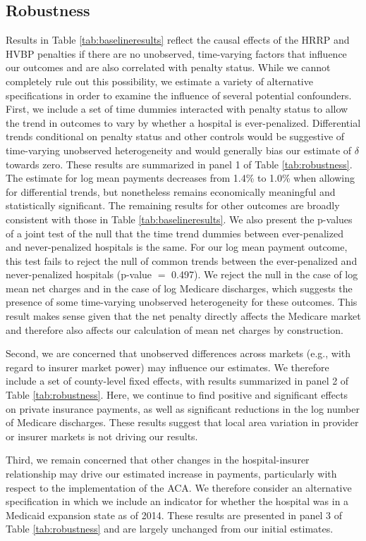 \documentclass[12pt]{article}
\begin{document}
\subsection{Robustness}
Results in Table \ref{tab:baselineresults} reflect the causal effects of the HRRP and HVBP penalties if there are no unobserved, time-varying factors that influence our outcomes and are also correlated with penalty status.  While we cannot completely rule out this possibility, we estimate a variety of alternative specifications in order to examine the influence of several potential confounders.  First, we include a set of time dummies interacted with penalty status to allow the trend in outcomes to vary by whether a hospital is ever-penalized. Differential trends conditional on penalty status and other controls would be suggestive of time-varying unobserved heterogeneity and would generally bias our estimate of $\delta$ towards zero.  These results are summarized in panel 1 of Table \ref{tab:robustness}. The estimate for log mean payments decreases from 1.4\% to 1.0\% when allowing for differential trends, but nonetheless remains economically meaningful and statistically significant. The remaining results for other outcomes are broadly consistent with those in Table \ref{tab:baselineresults}. We also present the p-values of a joint test of the null that the time trend dummies between ever-penalized and never-penalized hospitals is the same. For our log mean payment outcome, this test fails to reject the null of common trends between the ever-penalized and never-penalized hospitals (p-value $=$ 0.497). We reject the null in the case of log mean net charges and in the case of log Medicare discharges, which suggests the presence of some time-varying unobserved heterogeneity for these outcomes. This result makes sense given that the net penalty directly affects the Medicare market and therefore also affects our calculation of mean net charges by construction.

Second, we are concerned that unobserved differences across markets (e.g., with regard to insurer market power) may influence our estimates. We therefore include a set of county-level fixed effects, with results summarized in panel 2 of Table \ref{tab:robustness}. Here, we continue to find positive and significant effects on private insurance payments, as well as significant reductions in the log number of Medicare discharges. These results suggest that local area variation in provider or insurer markets is not driving our results.

Third, we remain concerned that other changes in the hospital-insurer relationship may drive our estimated increase in payments, particularly with respect to the implementation of the ACA. We therefore consider an alternative specification in which we include an indicator for whether the hospital was in a Medicaid expansion state as of 2014. These results are presented in panel 3 of Table \ref{tab:robustness} and are largely unchanged from our initial estimates.
\end{document}
